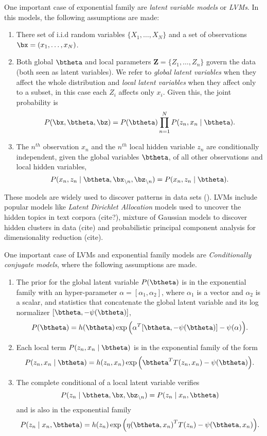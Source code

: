 One important case of exponential family are \emph{latent variable models} or \emph{LVMs}. In this models, the following assumptions are made:
\begin{enumerate}\itemsep0.5em
  \item There set of i.i.d random variables \(\{X_{1},\dots,X_{N}\}\) and a set of observations \(\bx = (x_{1}, \dots, x_{N})\).
  \item Both global \(\btheta\) and local parameters \(\bm{Z} = \{Z_{1}, \dots, Z_{n}\}\) govern the data (both seen as latent variables). We refer to \emph{global latent variables} when they affect the whole distribution and \emph{local latent variables} when they affect only to a subset, in this case each \(Z_{i}\) affects only \(x_{i}\). Given this, the joint probability is
    \[
    P(\bx, \btheta, \bz) = P(\btheta)\prod_{n=1}^{N}P(z_{n}, x_{n} \mid \btheta).
    \]
  \item The \(n^{th}\) observation \(x_{n}\) and the \(n^{th}\) local hidden variable \(z_{n}\) are conditionally independent, given the global variables \(\btheta\), of all other observations and local hidden variables,
    \[
    P(x_{n},z_{n} \mid \btheta, \bx_{\backslash n}, \bz_{\backslash n}) = P(x_{n}, z_{n} \mid \btheta).
    \]
\end{enumerate}

\begin{remark}
  These models are widely used to discover patterns in data sets (\cite{blei2014build}).
  LVMs include popular models like \emph{Latent Dirichlet Allocation} models used to uncover the hidden topics in text corpora (cite?), mixture of Gaussian models to discover hidden clusters in data (cite) and probabilistic principal component analysis for dimensionality reduction (cite).
\end{remark}

One important case of LVMs and exponential family models are \emph{Conditionally conjugate models}, where the following assumptions are made.
\begin{enumerate}[itemsep=2ex]
  \item The prior for the global latent variable \(P(\btheta)\) is in the exponential family with an hyper-parameter \(\alpha = [\alpha_{1}, \alpha_{2}]\), where \(\alpha_{1}\) is a vector and \(\alpha_{2}\) is a scalar, and statistics that concatenate the global latent variable and its log normalizer \([\btheta, -\psi(\btheta)]\),
    \[
    P(\btheta) = h(\btheta) \exp \Big( \alpha^{T}[\btheta, -\psi(\btheta)] - \psi(\alpha)\Big).
    \]
  \item Each local term \(P(z_{n},x_{n} \mid \btheta)\) is in the exponential family of the form
    \[
    P(z_{n},x_{n} \mid \btheta) = h(z_{n}, x_{n}) \exp \Big( \btheta^{T} T(z_{n}, x_{n}) - \psi(\btheta) \Big).
    \]
  \item The complete conditional of a local latent variable verifies
    \[
    P(z_{n} \mid \btheta, \bx, \bz_{\backslash n}) = P(z_{n} \mid x_{n}, \btheta)
    \]
    and is also in the exponential family
    \[
    P(z_{n}\mid x_{n} , \btheta) =  h(z_{n})\exp \Big( {\eta(\btheta, x_{n})}^{T}T(z_{n}) - \psi(\btheta, x_{n}) \Big).
    \]

\end{enumerate}

